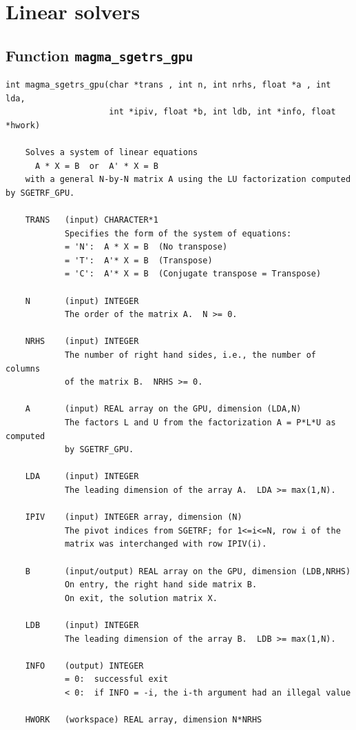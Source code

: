 \documentclass[10pt]{book}
\begin{document}
\newpage
\section{Linear solvers}

\newpage
\subsection{Function {\tt {\bf magma\_sgetrs\_gpu}}}
\begin{verbatim}
int magma_sgetrs_gpu(char *trans , int n, int nrhs, float *a , int lda,
                     int *ipiv, float *b, int ldb, int *info, float *hwork)

    Solves a system of linear equations
      A * X = B  or  A' * X = B
    with a general N-by-N matrix A using the LU factorization computed by SGETRF_GPU.

    TRANS   (input) CHARACTER*1
            Specifies the form of the system of equations:
            = 'N':  A * X = B  (No transpose)
            = 'T':  A'* X = B  (Transpose)
            = 'C':  A'* X = B  (Conjugate transpose = Transpose)

    N       (input) INTEGER
            The order of the matrix A.  N >= 0.

    NRHS    (input) INTEGER
            The number of right hand sides, i.e., the number of columns
            of the matrix B.  NRHS >= 0.

    A       (input) REAL array on the GPU, dimension (LDA,N)
            The factors L and U from the factorization A = P*L*U as computed
            by SGETRF_GPU.

    LDA     (input) INTEGER
            The leading dimension of the array A.  LDA >= max(1,N).

    IPIV    (input) INTEGER array, dimension (N)
            The pivot indices from SGETRF; for 1<=i<=N, row i of the
            matrix was interchanged with row IPIV(i).

    B       (input/output) REAL array on the GPU, dimension (LDB,NRHS)
            On entry, the right hand side matrix B.
            On exit, the solution matrix X.

    LDB     (input) INTEGER
            The leading dimension of the array B.  LDB >= max(1,N).

    INFO    (output) INTEGER
            = 0:  successful exit
            < 0:  if INFO = -i, the i-th argument had an illegal value

    HWORK   (workspace) REAL array, dimension N*NRHS
\end{verbatim}
\end{document}
